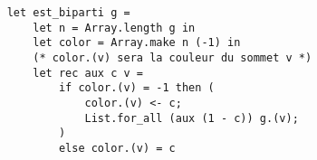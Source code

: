 \documentclass[varwidth=10cm]{standalone}
\begin{document}
\begin{verbatim}
    let est_biparti g =
        let n = Array.length g in 
        let color = Array.make n (-1) in
        (* color.(v) sera la couleur du sommet v *)
        let rec aux c v =
            if color.(v) = -1 then (
                color.(v) <- c;
                List.for_all (aux (1 - c)) g.(v);
            )
            else color.(v) = c
\end{verbatim}
\end{document}
